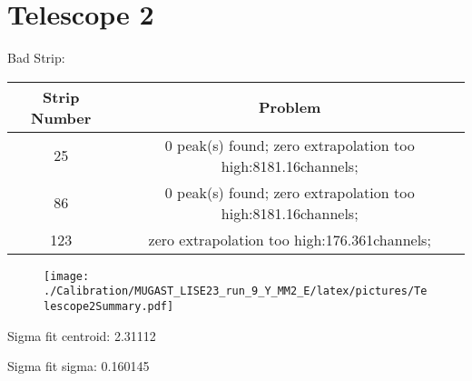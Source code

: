 \documentclass[a4paper,6pt]{article}
\begin{document}
\section{Telescope 2 }
 Bad Strip:
\begin{center}
\begin{tabular}{ | c | c | } 
\hline 
 Strip Number & Problem \\ \hline 
25 &  0 peak(s) found; zero extrapolation too high:8181.16channels;  \\ \hline 
86 &  0 peak(s) found; zero extrapolation too high:8181.16channels;  \\ \hline 
123 &  zero extrapolation too high:176.361channels;  \\ \hline 
\end{tabular} 
\end{center}
\begin{figure}[htcb!]
\begin{center}
\texttt{[image: ./Calibration/MUGAST\_LISE23\_run\_9\_Y\_MM2\_E/latex/pictures/Telescope2Summary.pdf]}
\end{center}
\end{figure}
\pagebreak
Sigma fit centroid: 2.31112

Sigma fit sigma: 0.160145
\end{document}
